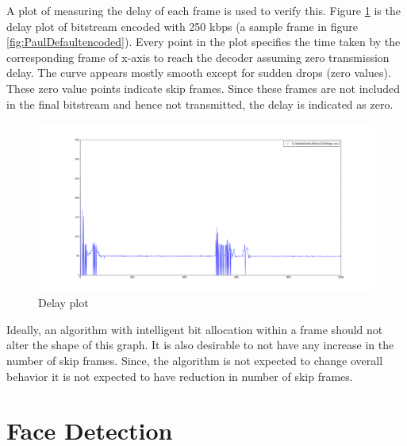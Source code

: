 \documentclass[11pt]{article} %
\begin{document}
A plot of measuring the delay of each frame is used to verify this. Figure \ref{fig:PaulDefault250kbpsDelay} is the delay plot of bitstream encoded with 250 kbps (a sample frame in figure \ref{fig:PaulDefaultencoded}). Every point in the plot specifies the time taken by the corresponding frame of x-axis to reach the decoder assuming zero transmission delay. The curve appears mostly smooth except for sudden drops (zero values). These zero value points indicate skip frames. Since these frames are not included in the final bitstream and hence not transmitted, the delay is indicated as zero. 
\begin{figure}[!h]
    \includegraphics[scale=0.25]{PaulDefault250kbpsDelay}
    \caption{Delay plot}
    \label{fig:PaulDefault250kbpsDelay}
\end{figure} 
Ideally, an algorithm with intelligent bit allocation within a frame should not alter the shape of this graph. It is also desirable to not have any increase in the number of skip frames. Since, the algorithm is not expected to change overall behavior it is not expected to have reduction in number of skip frames.
%
%
\section{Face Detection}
\end{document}
